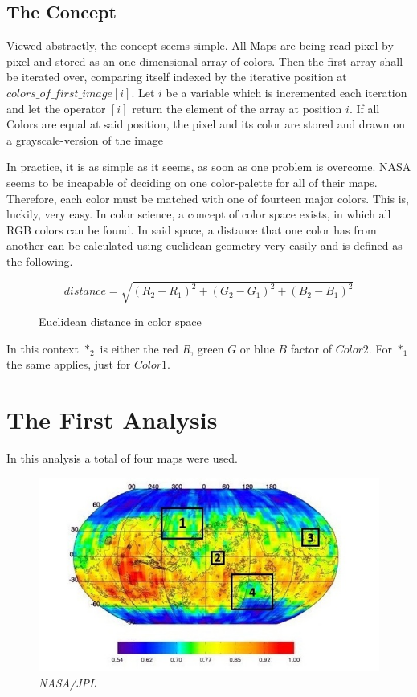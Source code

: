 \documentclass{article}
\newcommand*{\captionsource}[2]{%
    \caption*{%
        \noindent%
        {\fontsize{8pt}{8pt}%
            \selectfont \noindent \null \hfill \emph{#2}%
        }%
        \\\hspace{\linewidth}%
        {\fontsize{10pt}{10pt}%
            \selectfont \noindent \centering{#1}%
        }%
    }%
}
\begin{document}
\begin{multicols}{3}
\section{The Concept}

Viewed abstractly, the concept seems simple.
All Maps are being read pixel by pixel and stored as an one-dimensional array of colors.
Then the first array shall be iterated over, comparing itself indexed by the iterative position at \(colors\_of\_first\_image[i]\).
Let \(i\) be a variable which is incremented each iteration and let the operator \([i]\) return the element of the array at position \(i\).
If all Colors are equal at said position, the pixel and its color are stored and drawn on a grayscale-version of the image

In practice, it is as simple as it seems, as soon as one problem is overcome.
NASA seems to be incapable of deciding on one color-palette for all of their maps.
Therefore, each color must be matched with one of fourteen major colors.
This is, luckily, very easy.
In color science, a concept of color space exists, in which all RGB colors can be found.
In said space, a distance that one color has from another can be calculated using euclidean geometry very easily and is defined as the following.

\end{multicols}
\begin{figure}[H]
\[distance = \sqrt{(R_2 - R_1)^2 + (G_2 - G_1)^2 + (B_2 - B_1)^2}\]
\caption{Euclidean distance in color space}
\end{figure}
\begin{multicols}{3}
In this context \(*_2\) is either the red \(R\), green \(G\) or blue \(B\) factor of \(Color 2\).
For \(*_1\) the same applies, just for \(Color 1\).

\section{The First Analysis}
In this analysis a total of four maps were used.

\end{multicols}
\begin{figure}[H]
\includegraphics[width=\textwidth]{first/raw/neutron_rad.jpg}
\captionsource{Neutron Radiation on Mars surface}{NASA/JPL}
\label{fig:neutron_rad}
\end{figure}
\end{document}
